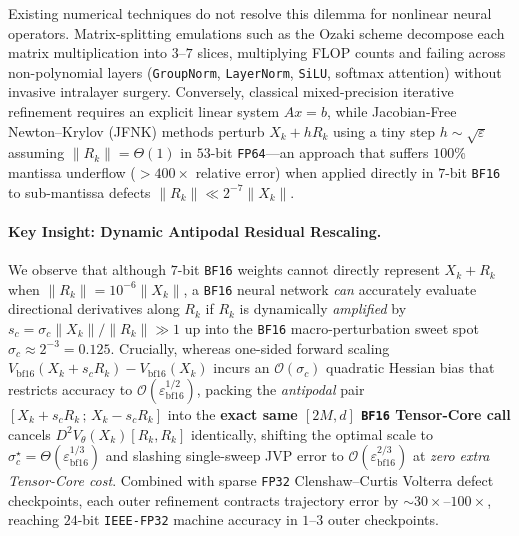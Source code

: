 \documentclass[11pt,a4paper]{article}
\theoremstyle{definition}
\theoremstyle{remark}
\newcommand{\bfsixteen}{\texttt{BF16}}
\newcommand{\fpthirtytwo}{\texttt{FP32}}
\newcommand{\fpsixtyfour}{\texttt{FP64}}
\newcommand{\epsbf}{\varepsilon_{\mathrm{bf16}}}
\begin{document}
Existing numerical techniques do not resolve this dilemma for nonlinear neural operators. Matrix-splitting emulations such as the Ozaki scheme \citep{ozaki2012error,ootomo2024recovering} decompose each matrix multiplication into $3$--$7$ slices, multiplying FLOP counts and failing across non-polynomial layers (\texttt{GroupNorm}, \texttt{LayerNorm}, \texttt{SiLU}, softmax attention) without invasive intralayer surgery. Conversely, classical mixed-precision iterative refinement \citep{higham2002accuracy,carson2018accelerating,haidar2018harnessing} requires an explicit linear system $Ax=b$, while Jacobian-Free Newton--Krylov (\textsc{JFNK}) methods \citep{knoll2004jacobian} perturb $X_k + h R_k$ using a tiny step $h \sim \sqrt{\varepsilon}$ assuming $\|R_k\| = \Theta(1)$ in $53$-bit \fpsixtyfour{}---an approach that suffers $100\%$ mantissa underflow ($>400\times$ relative error) when applied directly in $7$-bit \bfsixteen{} to sub-mantissa defects $\|R_k\| \ll 2^{-7}\|X_k\|$.

\paragraph{Key Insight: Dynamic Antipodal Residual Rescaling.}
We observe that although $7$-bit \bfsixteen{} weights cannot directly represent $X_k + R_k$ when $\|R_k\| = 10^{-6}\|X_k\|$, a \bfsixteen{} neural network \emph{can} accurately evaluate directional derivatives along $R_k$ if $R_k$ is dynamically \emph{amplified} by $s_c = \sigma_c \|X_k\| / \|R_k\| \gg 1$ up into the \bfsixteen{} macro-perturbation sweet spot $\sigma_c \approx 2^{-3} = 0.125$. Crucially, whereas one-sided forward scaling $V_{\mathrm{bf16}}(X_k + s_c R_k) - V_{\mathrm{bf16}}(X_k)$ incurs an $\mathcal{O}(\sigma_c)$ quadratic Hessian bias that restricts accuracy to $\mathcal{O}(\epsbf^{1/2})$, packing the \emph{antipodal} pair $[X_k + s_c R_k \,;\, X_k - s_c R_k]$ into the \textbf{exact same $[2M, d]$ \bfsixteen{} Tensor-Core call} cancels $D^2 V_\theta(X_k)[R_k, R_k]$ identically, shifting the optimal scale to $\sigma_c^\star = \Theta(\epsbf^{1/3})$ and slashing single-sweep JVP error to $\mathcal{O}(\epsbf^{2/3})$ at \emph{zero extra Tensor-Core cost}. Combined with sparse \fpthirtytwo{} Clenshaw--Curtis Volterra defect checkpoints, each outer refinement contracts trajectory error by $\sim 30\times$--$100\times$, reaching $24$-bit \texttt{IEEE-FP32} machine accuracy in $1$--$3$ outer checkpoints.
\end{document}
